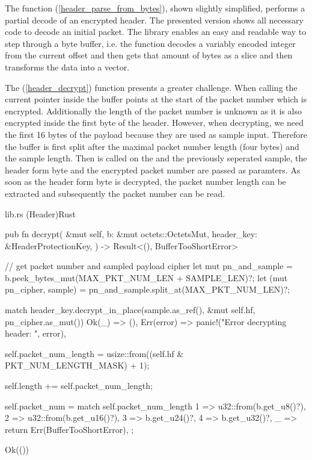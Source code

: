 The function (\ref{header_parse_from_bytes}), shown slightly simplified, performs a partial decode of
an encrypted header. The presented version shows all necessary code to decode an initial packet. The  library
enables an easy and readable way to step through a byte buffer, i.e. the function 
decodes a variably encoded integer from the current offset and then gets that amount of bytes as a slice \inlinecode{\&[u8]} and
 then transforms the data into a vector.

The (\ref{header_decrypt}) function presents a greater challenge. When calling  the current pointer inside the
buffer points at the start of the packet number which is encrypted. Additionally the length of the packet number is unknown as
it is also encrypted inside the first byte of the header. However, when decrypting, we need the first 16 bytes of the payload
because they are used as sample input. Therefore the buffer is first split after the maximal packet number length (four bytes)
and the sample length. Then  is called on the  and the
previously seperated sample, the header form byte and the encrypted packet number are passed as paramters. As soon as the header
form byte is decrypted, the packet number length can be extracted and subsequently the packet number can be read.

\begin{codeblock}{lib.rs (Header)}{Rust}
    \begin{rustcode}
        pub fn decrypt(
            &mut self,
            b: &mut octets::OctetsMut,
            header_key: &HeaderProtectionKey,
        ) -> Result<(), BufferTooShortError> {
            // get packet number and sampled payload cipher
            let mut pn_and_sample = b.peek_bytes_mut(MAX_PKT_NUM_LEN + SAMPLE_LEN)?;
            let (mut pn_cipher, sample) = pn_and_sample.split_at(MAX_PKT_NUM_LEN)?;

            match header_key.decrypt_in_place(sample.as_ref(), &mut self.hf, pn_cipher.as_mut()) {
                Ok(_) => (),
                Err(error) => panic!("Error decrypting header: {}", error),
            }

            self.packet_num_length = usize::from((self.hf & PKT_NUM_LENGTH_MASK) + 1);

            self.length += self.packet_num_length;

            self.packet_num = match self.packet_num_length {
                1 => u32::from(b.get_u8()?),
                2 => u32::from(b.get_u16()?),
                3 => b.get_u24()?,
                4 => b.get_u32()?,
                _ => return Err(BufferTooShortError),
            };

            Ok(())
        }
    \end{rustcode}
    \label{header_decrypt}
\end{codeblock}

